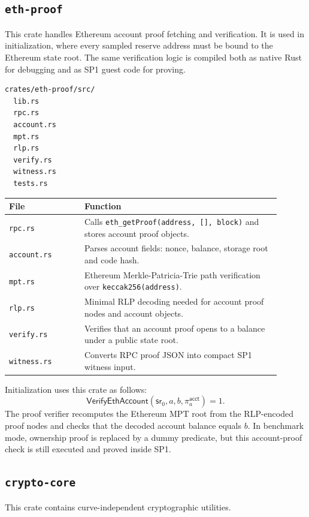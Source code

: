 \documentclass[UTF8,a4paper,11pt]{ctexart}
\newcommand{\sr}{\mathsf{sr}}
\begin{document}
\subsection{\texttt{eth-proof}}

This crate handles Ethereum account proof fetching and verification. It is used in initialization, where every sampled reserve address must be bound to the Ethereum state root. The same verification logic is compiled both as native Rust for debugging and as SP1 guest code for proving.

\begin{lstlisting}
crates/eth-proof/src/
  lib.rs
  rpc.rs
  account.rs
  mpt.rs
  rlp.rs
  verify.rs
  witness.rs
  tests.rs
\end{lstlisting}

\begin{longtable}{p{0.25\linewidth}p{0.65\linewidth}}
\toprule
File & Function \\
\midrule
\texttt{rpc.rs} & Calls \texttt{eth\_getProof(address, [], block)} and stores account proof objects. \\
\texttt{account.rs} & Parses account fields: nonce, balance, storage root and code hash. \\
\texttt{mpt.rs} & Ethereum Merkle-Patricia-Trie path verification over \texttt{keccak256(address)}. \\
\texttt{rlp.rs} & Minimal RLP decoding needed for account proof nodes and account objects. \\
\texttt{verify.rs} & Verifies that an account proof opens to a balance under a public state root. \\
\texttt{witness.rs} & Converts RPC proof JSON into compact SP1 witness input. \\
\bottomrule
\end{longtable}

Initialization uses this crate as follows:
\[
  \mathsf{VerifyEthAccount}(\sr_0,a,b,\pi^{\mathsf{acct}}_a)=1.
\]
The proof verifier recomputes the Ethereum MPT root from the RLP-encoded proof nodes and checks that the decoded account balance equals $b$. In benchmark mode, ownership proof is replaced by a dummy predicate, but this account-proof check is still executed and proved inside SP1.

\subsection{\texttt{crypto-core}}

This crate contains curve-independent cryptographic utilities.
\end{document}
